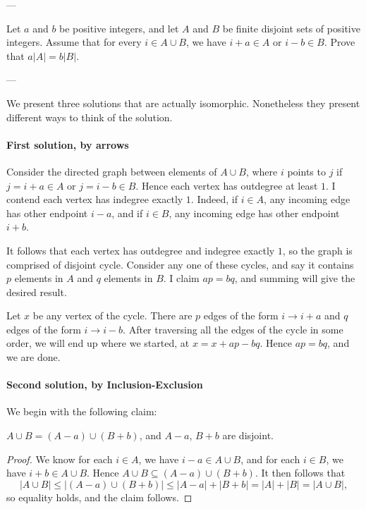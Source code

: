 
---

Let $a$ and $b$ be positive integers, and let $A$ and $B$ be finite disjoint sets of positive integers. Assume that for every $i\in A\cup B$, we have $i+a\in A$ or $i-b\in B$. Prove that $a|A|=b|B|$.

---

We present three solutions that are actually isomorphic. Nonetheless they present different ways to think of the solution.

\paragraph{First solution, by arrows} Consider the directed graph between elements of $A\cup B$, where $i$ points to $j$ if $j=i+a\in A$ or $j=i-b\in B$. Hence each vertex has outdegree at least $1$. I contend each vertex has indegree exactly $1$. Indeed, if $i\in A$, any incoming edge has other endpoint $i-a$, and if $i\in B$, any incoming edge has other endpoint $i+b$.

It follows that each vertex has outdegree and indegree exactly $1$, so the graph is comprised of disjoint cycle. Consider any one of these cycles, and say it contains $p$ elements in $A$ and $q$ elements in $B$. I claim $ap=bq$, and summing will give the desired result.

Let $x$ be any vertex of the cycle. There are $p$ edges of the form $i\to i+a$ and $q$ edges of the form $i\to i-b$. After traversing all the edges of the cycle in some order, we will end up where we started, at $x=x+ap-bq$. Hence $ap=bq$, and we are done.

\paragraph{Second solution, by Inclusion-Exclusion} We begin with the following claim:
\begin{iclaim*}
    $A\cup B=(A-a)\cup(B+b)$, and $A-a$, $B+b$ are disjoint.
\end{iclaim*}
\begin{proof}
    We know for each $i\in A$, we have $i-a\in A\cup B$, and for each $i\in B$, we have $i+b\in A\cup B$. Hence $A\cup B\subseteq(A-a)\cup(B+b)$. It then follows that \[|A\cup B|\le|(A-a)\cup(B+b)|\le|A-a|+|B+b|=|A|+|B|=|A\cup B|,\]
    so equality holds, and the claim follows.
\end{proof}

